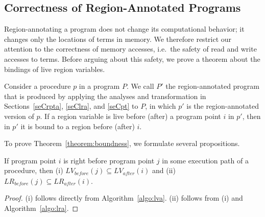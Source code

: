 \documentclass{tlp}
\newcommand{\LVb}[1]{\ensuremath{\mathit{LV}_{\mathit{before}}(#1)}}
\newcommand{\LVa}[1]{\ensuremath{\mathit{LV}_{\mathit{after}}(#1)}}
\newcommand{\LRb}[1]{\ensuremath{\mathit{LR}_{before}(#1)}}
\newcommand{\LRa}[1]{\ensuremath{\mathit{LR}_{after}(#1)}}
\begin{document}
\subsection{Correctness of Region-Annotated Programs}
\label{seCptCcorrectness}

Region-annotating a program does not change its computational behavior;
it changes only the locations of terms in memory.
We therefore restrict our attention to the correctness of memory accesses,
i.e.\ the safety of read and write accesses to terms.
Before arguing about this safety,
we prove a theorem about the bindings of live region variables.

\begin{theorem}
\label{theorem:boundness}
    Consider a procedure $p$ in a program $P$.
    We call $P'$ the region-annotated program
    that is produced by applying the analyses and transformation in
    Sections~\ref{seCrpta}, \ref{seClra}, and \ref{seCpt} to $P$,
    in which $p'$ is the region-annotated version of $p$.
    If a region variable is live before (after) a program point $i$ in $p'$,
    then in $p'$ it is bound to a region before (after) $i$.
\end{theorem}
To prove Theorem~\ref{theorem:boundness}, we formulate several propositions.
\begin{proposition}
\label{propo:one}
    If program point $i$ is right before program point
    $j$ in some execution path of a procedure, then
    (i) $\LVb{j} \subseteq \LVa{i}$ and (ii) $\LRb{j} \subseteq \LRa{i}$.
\end{proposition}
\begin{proof}
    (i) follows directly from Algorithm~\ref{algo:lva}.
    (ii) follows from (i) and Algorithm~\ref{algo:lra}.
\end{proof}
\end{document}

